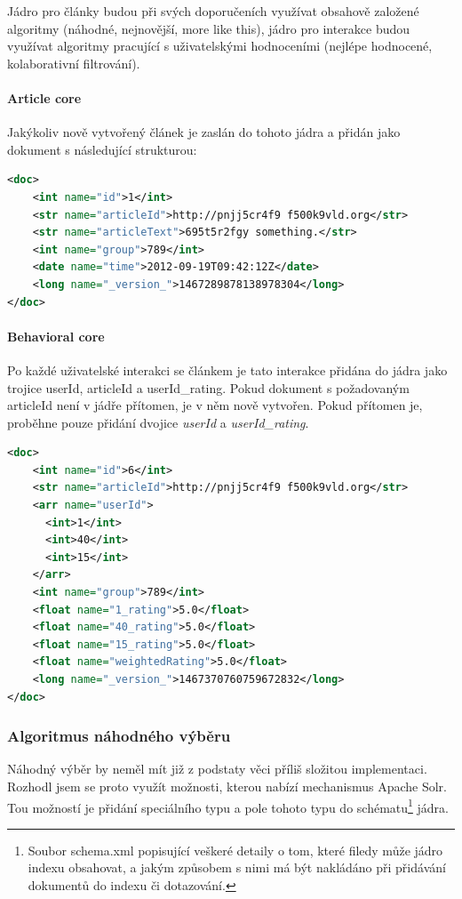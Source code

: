 \documentclass[thesis=M,czech]{FITthesis}[2014/05/07]
\begin{document}
Jádro pro články budou při svých doporučeních využívat obsahově založené algoritmy (náhodné, nejnovější, more like this), jádro pro interakce budou využívat algoritmy pracující s uživatelskými hodnoceními (nejlépe hodnocené, kolaborativní filtrování).

\paragraph{Article core}
Jakýkoliv nově vytvořený článek je zaslán do tohoto jádra a přidán jako dokument s následující strukturou:

\begin{lstlisting}[language=xml]
 <doc>
    <int name="id">1</int>
    <str name="articleId">http://pnjj5cr4f9 f500k9vld.org</str>
    <str name="articleText">695t5r2fgy something.</str>
    <int name="group">789</int>
    <date name="time">2012-09-19T09:42:12Z</date>
    <long name="_version_">1467289878138978304</long>
</doc>
\end{lstlisting}

\paragraph{Behavioral core}
Po každé uživatelské interakci se článkem je tato interakce přidána do jádra jako trojice userId, articleId a userId\_rating. Pokud dokument s požadovaným articleId není v jádře přítomen, je v něm nově vytvořen. Pokud přítomen je, proběhne pouze přidání dvojice \emph{userId} a \emph{userId\_rating}.

\begin{lstlisting}[language=xml]
<doc>
    <int name="id">6</int>
    <str name="articleId">http://pnjj5cr4f9 f500k9vld.org</str>
    <arr name="userId">
      <int>1</int>
      <int>40</int>      
      <int>15</int>      
    </arr>
    <int name="group">789</int>
    <float name="1_rating">5.0</float>
    <float name="40_rating">5.0</float>
    <float name="15_rating">5.0</float>        
    <float name="weightedRating">5.0</float>
    <long name="_version_">1467370760759672832</long>
</doc>
\end{lstlisting}

\subsubsection{Algoritmus náhodného výběru}
Náhodný výběr by neměl mít již z podstaty věci příliš složitou implementaci. Rozhodl jsem se proto využít možnosti, kterou nabízí mechanismus Apache Solr. Tou možností je přidání speciálního typu a pole tohoto typu do schématu\footnote{Soubor schema.xml popisující veškeré detaily o tom, které filedy může jádro indexu obsahovat, a jakým způsobem s nimi má být nakládáno při přidávání dokumentů do indexu či dotazování.} jádra. 
\end{document}
